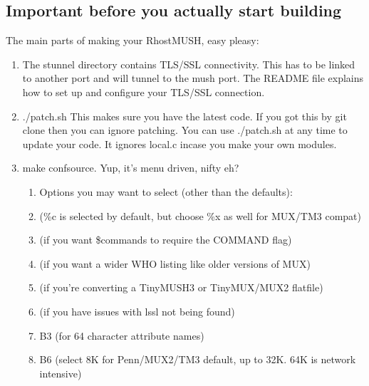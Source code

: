 \documentclass[letterpaper,10pt,english]{sphinxmanual}
\begin{document}
\subsection{Important before you actually start building}
\label{\detokenize{install:important-before-you-actually-start-building}}
\sphinxAtStartPar
The main parts of making your RhostMUSH, easy pleasy:
\begin{enumerate}
%
\item {} 
\sphinxAtStartPar
The stunnel directory contains TLS/SSL connectivity.  This has to be linked to another port and will tunnel to the mush port.  The README file explains how to set up and configure your TLS/SSL connection.

\item {} 
\sphinxAtStartPar
./patch.sh \textendash{} This makes sure you have the latest code.  If you got this by git clone  then you can ignore patching.  You can use ./patch.sh at any time to update your code.  It ignores local.c incase you make your own modules.

\item {} 
\sphinxAtStartPar
make confsource.  Yup, it’s menu driven, nifty eh?
\begin{enumerate}
%
\item {} 
\sphinxAtStartPar
Options you may want to select (other than the defaults):

\item {} 
  (\%c is selected by default, but choose \%x as well for MUX/TM3 compat)

\item {} 
  (if you want \$commands to require the COMMAND flag)

\item {} 
 (if you want a wider WHO listing like older versions of MUX)

\item {} 
 (if you’re converting a TinyMUSH3 or TinyMUX/MUX2 flatfile)

\item {} 
 (if you have issues with \sphinxhyphen{}lssl not being found)

\item {} 
\sphinxAtStartPar
B3 (for 64 character attribute names)

\item {} 
\sphinxAtStartPar
B6 (select 8K for Penn/MUX2/TM3 default, up to 32K.  64K is network intensive)


\end{enumerate}
\end{enumerate}
\end{document}
